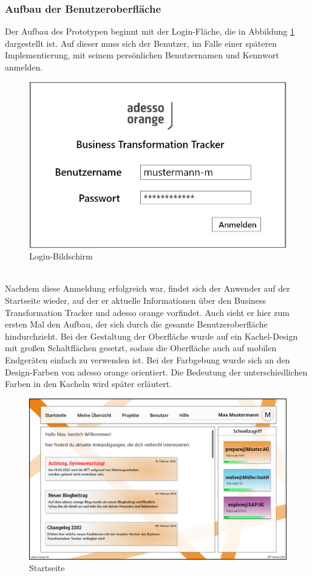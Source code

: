 \subsubsection{Aufbau der Benutzeroberfläche}
Der Aufbau des Prototypen beginnt mit der Login-Fläche, die in Abbildung \ref{fig:Login} dargestellt ist. Auf dieser muss sich der Benutzer, im Falle einer späteren Implementierung, mit seinem persönlichen Benutzernamen und Kennwort anmelden.
\begin{figure}[h!]
    \centering
    \includegraphics[scale=0.35]{./Prototyp/01_Login.png}
    \caption[Prototyp: Login-Bildschirm]{Login-Bildschirm}
    \label{fig:Login}
\end{figure}
\\Nachdem diese Anmeldung erfolgreich war, findet sich der Anwender auf der Startseite wieder, auf der er aktuelle Informationen über den Business Transformation Tracker und adesso orange vorfindet.
Auch sieht er hier zum ersten Mal den Aufbau, der sich durch die gesamte Benutzeroberfläche hindurchzieht. Bei der Gestaltung der Oberfläche wurde auf ein \glqq{}Kachel-Design\grqq{} mit großen Schaltflächen gesetzt, sodass die Oberfläche auch auf mobilen Endgeräten einfach zu verwenden ist. Bei der Farbgebung wurde sich an den Design-Farben von adesso orange orientiert. Die Bedeutung der unterschiedlichen Farben in den Kacheln wird später erläutert. 
\begin{figure}[h!]
    \centering
    \includegraphics[scale=0.35]{./Prototyp/02_Startseite.png}
    \caption[Prototyp: Startseite]{Startseite}
    \label{fig:Startseite}
\end{figure}
